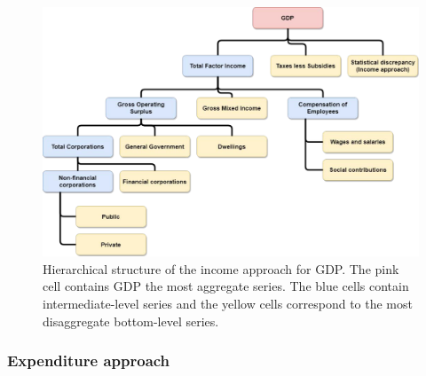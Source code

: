 \documentclass[graybox]{svmult}
\begin{document}
\begin{figure}[!h]
	\centering
	\includegraphics[width=.9\textwidth]{Figs/Hierarchical-structures/IncomeApproach.pdf}
	\caption{Hierarchical structure of the income approach for GDP\@. The pink cell contains GDP the most aggregate series. The blue cells contain intermediate-level series and the yellow cells correspond to the most disaggregate bottom-level series.}\label{fig:GDP_I}
\end{figure}

\subsubsection*{Expenditure approach}
\end{document}
